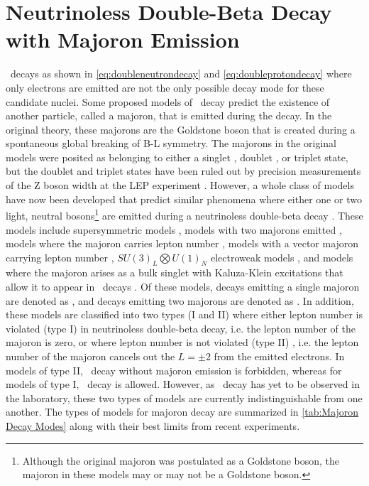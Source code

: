 \section{Neutrinoless Double-Beta Decay with Majoron Emission}
\label{sec:Neutrinoless Double-Beta Decay with Majoron Emisison}
\zeronubb~decays as shown in \autoref{eq:doubleneutrondecay} and \autoref{eq:doubleprotondecay} where only electrons are emitted are not the only possible decay mode for these candidate nuclei.
Some proposed models of \zeronubb~decay predict the existence of another particle, called a majoron, that is emitted during the decay.
In the original theory, these majorons are the Goldstone boson that is created during a spontaneous global breaking of B-L symmetry.
The majorons in the original models were posited as belonging to either a singlet  \cite{CHIKASHIGE1981265}, doublet \cite{AULAKH1982136}, or triplet \cite{GELMINI1981411} state, but the doublet and triplet states have been ruled out by precision measurements of the Z boson width at the LEP experiment \cite{ALEPH:2005ab}.
However, a whole class of models have now been developed that predict similar phenomena where either one or two light, neutral bosons\footnote{Although the original majoron was postulated as a Goldstone boson, the majoron in these models may or may not be a Goldstone boson.}
are emitted during a neutrinoless double-beta decay \cite{HIRSCH19968}.
These models include supersymmetric models \cite{MASIERO1990273}, models with two majorons emitted \cite{MOHAPATRA1988192}, models where the majoron carries lepton number \cite{Burgess:1992dt, PhysRevD.49.5925, BAMERT199525}, models with a vector majoron carrying lepton number \cite{CARONE199385}, $SU(3)_L\bigotimes U(1)_N$ electroweak models \cite{Montero:2000ar}, and models where the majoron arises as a bulk singlet with Kaluza-Klein excitations that allow it to appear in \zeronubb~decays \cite{Mohapatra:2000px}.
Of these models, decays emitting a single majoron are denoted as \zeronubbonechi, and decays emitting two majorons are denoted as \zeronubbtwochi.
In addition, these models are classified into two types (I and II) where either lepton number is  violated (type I) in neutrinoless double-beta decay, i.e. the lepton number of the majoron is zero, or where lepton number is not violated  (type II) , i.e. the lepton number of the majoron cancels out the $L=\pm2$ from the emitted electrons.
In models of type II, \zeronubb~decay without majoron emission is forbidden, whereas for models of type I, \zeronubb~decay is allowed.
However, as \zeronubb~decay has yet to be observed in the laboratory, these two types of models are currently indistinguishable from one another.
The types of models for majoron decay are summarized in \autoref{tab:Majoron Decay Modes} along with their best limits from recent experiments.

